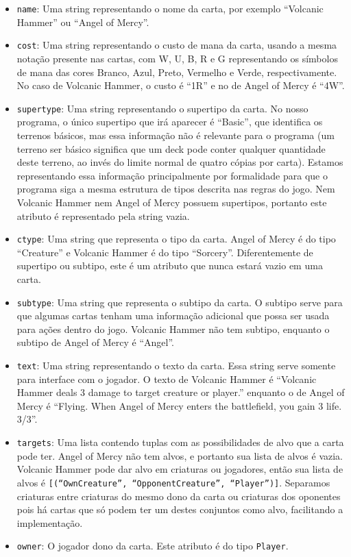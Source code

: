 \documentclass[dvipsnames]{book}
\begin{document}
\begin{itemize}
  \item\texttt{name}: Uma string representando o nome da carta, por exemplo ``Volcanic Hammer''
  ou ``Angel of Mercy''.
  \item\texttt{cost}: Uma string representando o custo de mana da carta, usando a mesma notação
  presente nas cartas, com W, U, B, R e G representando os símbolos de mana das cores Branco,
  Azul, Preto, Vermelho e Verde, respectivamente. No caso de Volcanic Hammer, o custo é ``1R''
  e no de Angel of Mercy é ``4W''.
  \item\texttt{supertype}: Uma string representando o supertipo da carta. No nosso programa,
  o único supertipo que irá aparecer é ``Basic'', que identifica os terrenos básicos, mas essa
  informação não é relevante para o programa (um terreno ser básico significa que um deck pode
  conter qualquer quantidade deste terreno, ao invés do limite normal de quatro cópias por carta).
  Estamos representando essa informação principalmente por formalidade para que o programa siga a
  mesma estrutura de tipos descrita nas regras do jogo. Nem Volcanic Hammer nem Angel of Mercy
  possuem supertipos, portanto este atributo é representado pela string vazia.
  \item\texttt{ctype}: Uma string que representa o tipo da carta. Angel of Mercy é do tipo
  ``Creature'' e Volcanic Hammer é do tipo ``Sorcery''. Diferentemente de supertipo ou subtipo,
  este é um atributo que nunca estará vazio em uma carta.
  \item\texttt{subtype}: Uma string que representa o subtipo da carta. O subtipo serve para que
  algumas cartas tenham uma informação adicional que possa ser usada para ações dentro do jogo.
  Volcanic Hammer não tem subtipo, enquanto o subtipo de Angel of Mercy é ``Angel''.
  \item\texttt{text}: Uma string representando o texto da carta. Essa string serve somente para
  interface com o jogador. O texto de Volcanic Hammer é ``Volcanic Hammer deals 3 damage to target
  creature or player.'' enquanto o de Angel of Mercy é ``Flying. When Angel of Mercy enters the
  battlefield, you gain 3 life. 3/3''.
  \item\texttt{targets}: Uma lista contendo tuplas com as possibilidades de alvo que a carta
  pode ter. Angel of Mercy não tem alvos, e portanto sua lista de alvos é vazia. Volcanic Hammer
  pode dar alvo em criaturas ou jogadores, então sua lista de alvos é
  \texttt{[(``OwnCreature'', ``OpponentCreature'', ``Player'')]}. Separamos criaturas  entre
  criaturas do mesmo dono da carta ou criaturas dos oponentes pois há cartas que só podem ter
  um destes conjuntos como alvo, facilitando a implementação.
  \item\texttt{owner}: O jogador dono da carta. Este atributo é do tipo \texttt{Player}.
\end{itemize}
\end{document}
